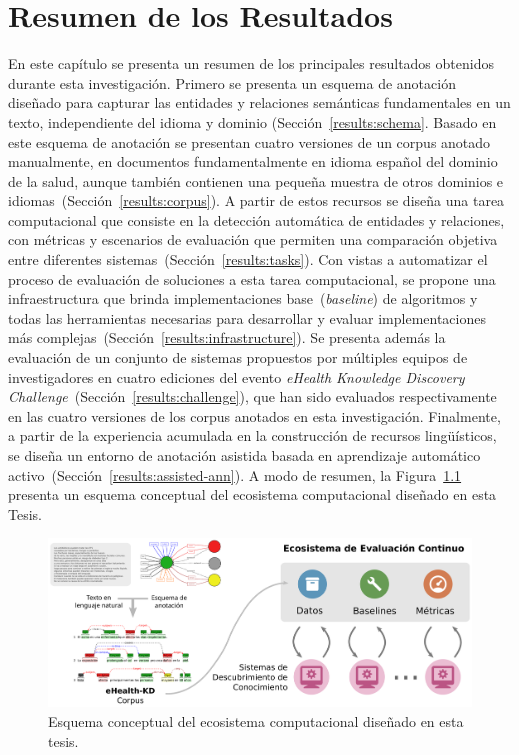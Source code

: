\chapter{Resumen de los Resultados}\label{Chap:Results}

En este capítulo se presenta un resumen de los principales resultados obtenidos durante esta investigación.
Primero se presenta un esquema de anotación diseñado para capturar las entidades y relaciones semánticas fundamentales en un texto, independiente del idioma y dominio (Sección~\ref{results:schema}.
Basado en este esquema de anotación se presentan cuatro versiones de un corpus anotado manualmente, en documentos fundamentalmente en idioma español del dominio de la salud, aunque también contienen una pequeña muestra de otros dominios e idiomas~(Sección~\ref{results:corpus}).
A partir de estos recursos se diseña una tarea computacional que consiste en la detección automática de entidades y relaciones, con métricas y escenarios de evaluación que permiten una comparación objetiva entre diferentes sistemas~(Sección~\ref{results:tasks}).
Con vistas a automatizar el proceso de evaluación de soluciones a esta tarea computacional, se propone una infraestructura que brinda implementaciones base~(\textit{baseline}) de algoritmos y todas las herramientas necesarias para desarrollar y evaluar implementaciones más complejas~(Sección~\ref{results:infrastructure}).
Se presenta además la evaluación de un conjunto de sistemas propuestos por múltiples equipos de investigadores en cuatro ediciones del evento \textit{eHealth Knowledge Discovery Challenge}~(Sección~\ref{results:challenge}), que han sido evaluados respectivamente en las cuatro versiones de los corpus anotados en esta investigación.
Finalmente, a partir de la experiencia acumulada en la construcción de recursos lingüísticos, se diseña un entorno de anotación asistida basada en aprendizaje automático activo~(Sección~\ref{results:assisted-ann}).
A modo de resumen, la Figura~\ref{fig:conceptualmap} presenta un esquema conceptual del ecosistema computacional diseñado en esta Tesis.

\begin{figure}
    \centering
    \includegraphics[width=\textwidth]{Images/Chapters/graphical-abstract.pdf}
    \caption{Esquema conceptual del ecosistema computacional diseñado en esta tesis.}
    \label{fig:conceptualmap}
\end{figure}

